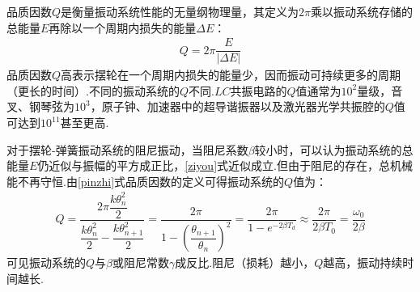 \documentclass[12pt,a4paper,oneside,left=3.18,right=3.18,top=2.54,bottom=2.54]{ctexart}
\begin{document}
			品质因数$Q$是衡量振动系统性能的无量纲物理量，其定义为$2\pi$乘以振动系统存储的总能量$E$再除以一个周期内损失的能量$\Delta E$：
			\begin{equation}
			\begin{aligned}
			Q=2\pi\dfrac{E}{|\Delta E|}
			\end{aligned}
			\label{pinzhi}
			\end{equation}
			品质因数$Q$高表示摆轮在一个周期内损失的能量少，因而振动可持续更多的周期（更长的时间）.不同的振动系统的$Q$不同.$LC$共振电路的$Q$值通常为$10^2$量级，音叉、钢琴弦为$10^3$，原子钟、加速器中的超导谐振器以及激光器光学共振腔的$Q$值可达到$10^{11}$甚至更高.\par
			对于摆轮-弹簧振动系统的阻尼振动，当阻尼系数$\beta$较小时，可以认为振动系统的总能量$E$仍近似与振幅的平方成正比，\eqref{ziyou}式近似成立.但由于阻尼的存在，总机械能不再守恒.由\eqref{pinzhi}式品质因数的定义可得振动系统的$Q$值为：
			\begin{equation}
			\begin{aligned}
			Q=\dfrac{2\pi\dfrac{k\theta_n^2}{2}}{\dfrac{k\theta_n^2}{2}-\dfrac{k\theta_{n+1}^2}{2}}=\dfrac{2\pi}{1-\left(\dfrac{\theta_{n+1}}{\theta_n}\right)^2}=\dfrac{2\pi}{1-e^{-2\beta T_d}}\approx\dfrac{2\pi}{2\beta T_0}=\dfrac{\omega_0}{2\beta}
			\end{aligned}
			\label{Q}
			\end{equation}
			可见振动系统的$Q$与$\beta$或阻尼常数$\gamma$成反比.阻尼（损耗）越小，$Q$越高，振动持续时间越长.
\end{document}
